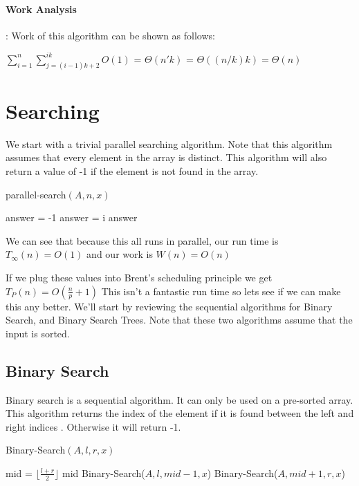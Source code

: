 \documentclass[11pt]{article}
\begin{document}
\paragraph{Work Analysis}: Work of this algorithm can be shown as follows:


$\sum_{i=1}^{n} \sum_{j=(i-1)k+2}^{ik}O(1)$ =
$\Theta(n'k)$ =
$\Theta((n/k) k) = \Theta(n)$

\section{Searching}

We start with a trivial parallel searching algorithm. Note that this algorithm assumes that every element in the array is distinct. This algorithm will also return a value of -1 if the element is not found in the array.

\begin{algorithm}
\caption{parallel-search$(A,n,x)$}
\begin{algorithmic}
\STATE answer = -1
	    \STATE answer = i
	\ENDIF
\ENDFOR
\RETURN answer
\end{algorithmic}
\end{algorithm}

We can see that because this all runs in parallel, our run time is $T_\infty(n) = O(1)$ and our work is $W(n) = O(n)$

If we plug these values into Brent's scheduling principle we get
$T_P(n) = O(\frac{n}{p}+1)$ This isn't a fantastic run time so lets see if we can make this any better. We'll start by reviewing the sequential algorithms for Binary Search, and Binary Search Trees. Note that these two algorithms assume that the input is sorted.

\subsection{Binary Search}
Binary search is a sequential algorithm. It can only be used on a pre-sorted array. This algorithm returns the index of the element if it is found between the left and right indices . Otherwise it will return -1.
\pagebreak


\begin{algorithm}
\caption{Binary-Search$(A,l,r,x)$}
\begin{algorithmic}
\ELSE
    \STATE mid = $\lfloor\frac{l+r}{2}\rfloor$
        \RETURN mid
        \RETURN Binary-Search($A,l,mid-1,x$)
    \ELSE
        \RETURN Binary-Search($A,mid+1,r,x$)
    \ENDIF
\ENDIF
\end{algorithmic}
\end{algorithm}
\end{document}
